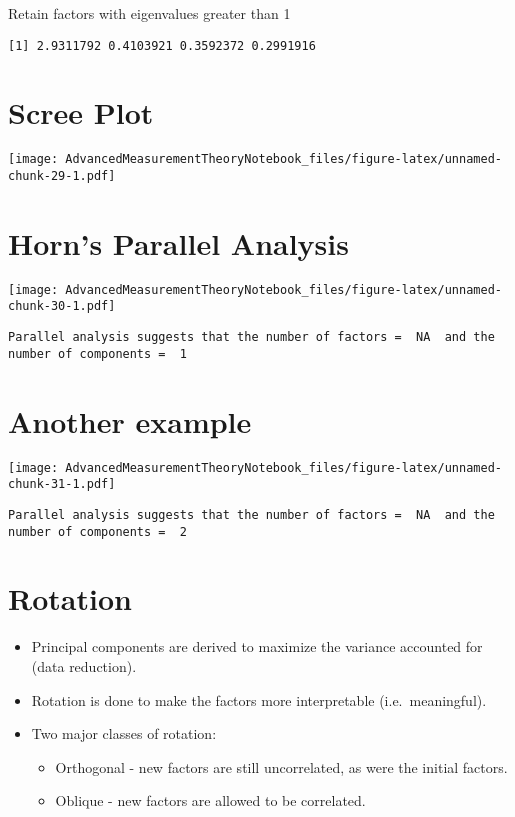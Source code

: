 \documentclass[
]{book}
\providecommand{\tightlist}{%
  \setlength{\itemsep}{0pt}\setlength{\parskip}{0pt}}
\begin{document}
Retain factors with eigenvalues greater than 1

\begin{verbatim}
[1] 2.9311792 0.4103921 0.3592372 0.2991916
\end{verbatim}

\hypertarget{scree-plot}{%
\section{Scree Plot}\label{scree-plot}}

\texttt{[image: AdvancedMeasurementTheoryNotebook\_files/figure-latex/unnamed-chunk-29-1.pdf]}

\hypertarget{horns-parallel-analysis}{%
\section{Horn's Parallel Analysis}\label{horns-parallel-analysis}}

\texttt{[image: AdvancedMeasurementTheoryNotebook\_files/figure-latex/unnamed-chunk-30-1.pdf]}

\begin{verbatim}
Parallel analysis suggests that the number of factors =  NA  and the number of components =  1 
\end{verbatim}

\hypertarget{another-example}{%
\section{Another example}\label{another-example}}

\texttt{[image: AdvancedMeasurementTheoryNotebook\_files/figure-latex/unnamed-chunk-31-1.pdf]}

\begin{verbatim}
Parallel analysis suggests that the number of factors =  NA  and the number of components =  2 
\end{verbatim}

\hypertarget{rotation}{%
\section{Rotation}\label{rotation}}

\begin{itemize}
\tightlist
\item
  Principal components are derived to maximize the variance accounted for (data reduction).
\item
  Rotation is done to make the factors more interpretable (i.e.~meaningful).
\item
  Two major classes of rotation:

  \begin{itemize}
  \tightlist
  \item
    Orthogonal - new factors are still uncorrelated, as were the initial factors.
  \item
    Oblique - new factors are allowed to be correlated.
  \end{itemize}
\end{itemize}
\end{document}
